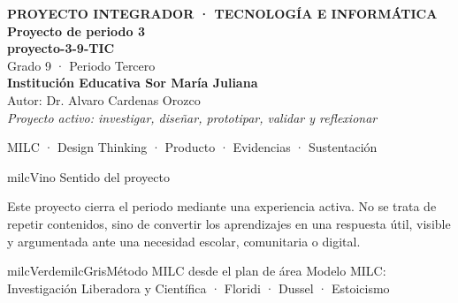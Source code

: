 \documentclass[11pt,letterpaper]{article}
\begin{document}
\thispagestyle{empty}

\vspace*{.85cm}
\begin{tcolorbox}[
  enhanced,colback=milcVino,colframe=milcVino,arc=12mm,width=.86\textwidth,
  boxrule=0pt,left=12mm,right=12mm,top=11mm,bottom=11mm,center,
  overlay={\draw[milcMagenta,line width=2pt,dash pattern=on 9pt off 8pt,rounded corners=10mm]
  ([xshift=7mm,yshift=-7mm]frame.north west) rectangle ([xshift=-7mm,yshift=7mm]frame.south east);}]
  \centering
  {\sffamily\bfseries\color{white}\fontsize{15}{17}\selectfont PROYECTO INTEGRADOR · TECNOLOGÍA E INFORMÁTICA}\\[1.0cm]
  {\sffamily\bfseries\color{white}\fontsize{30}{33}\selectfont Proyecto de periodo 3}\\[3mm]
  {\sffamily\bfseries\color{milcMostaza}\fontsize{25}{28}\selectfont proyecto-3-9-TIC}\\[8mm]
  {\sffamily\color{white}\Large Grado 9 · Periodo Tercero}\\[1.0cm]
  {\sffamily\bfseries\color{white}\large Institución Educativa Sor María Juliana}\\[2mm]
  {\sffamily\color{white}Autor: Dr. Alvaro Cardenas Orozco}\\[4mm]
  {\sffamily\itshape\color{white}Proyecto activo: investigar, diseñar, prototipar, validar y reflexionar}
\end{tcolorbox}
\vfill
\begin{tcolorbox}[enhanced,colback=milcVino!72!black,colframe=milcVino!72!black,arc=5mm,boxrule=0pt,width=.86\textwidth,left=6mm,right=6mm,top=4mm,bottom=4mm,center]
{\color{white}\sffamily\small MILC · Design Thinking · Producto · Evidencias · Sustentación}
\end{tcolorbox}

\newpage
\begin{titlebox}{milcVino}
Sentido del proyecto
\end{titlebox}
\begin{multicols}{2}
Este proyecto cierra el periodo mediante una experiencia activa. No se trata de repetir contenidos, sino de convertir los aprendizajes en una respuesta útil, visible y argumentada ante una necesidad escolar, comunitaria o digital.

\columnbreak
\begin{softbox}{milcVerde}{milcGris}{Método MILC desde el plan de área}
Modelo MILC: Investigación Liberadora y Científica · Floridi · Dussel · Estoicismo
\end{softbox}
\end{multicols}
\end{document}
